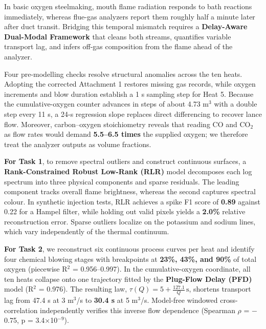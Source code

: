 
In basic oxygen steelmaking, mouth flame radiation responds to bath reactions immediately, whereas flue-gas analyzers report them roughly half a minute later after duct transit. Bridging this temporal mismatch requires a \textbf{Delay-Aware Dual-Modal Framework} that cleans both streams, quantifies variable transport lag, and infers off-gas composition from the flame ahead of the analyzer.

Four pre-modelling checks resolve structural anomalies across the ten heats. Adopting the corrected Attachment 1 restores missing gas records, while oxygen increments and blow duration establish a 1 s sampling step for Heat 5. Because the cumulative-oxygen counter advances in steps of about 4.73 m\ensuremath{^{3}} with a double step every 11 s, a 24-s regression slope replaces direct differencing to recover lance flow. Moreover, carbon–oxygen stoichiometry reveals that reading CO and CO\ensuremath{_{2}} as flow rates would demand \textbf{5.5–6.5 times} the supplied oxygen; we therefore treat the analyzer outputs as volume fractions.

\textbf{For Task 1}, to remove spectral outliers and construct continuous surfaces, a \textbf{Rank-Constrained Robust Low-Rank (RLR)} model decomposes each log spectrum into three physical components and sparse residuals. The leading component tracks overall flame brightness, whereas the second captures spectral colour. In synthetic injection tests, RLR achieves a spike F1 score of \textbf{0.89} against 0.22 for a Hampel filter, while holding out valid pixels yields a \textbf{2.0\%} relative reconstruction error. Sparse outliers localize on the potassium and sodium lines, which vary independently of the thermal continuum.

\textbf{For Task 2}, we reconstruct six continuous process curves per heat and identify four chemical blowing stages with breakpoints at \textbf{23\%, 43\%, and 90\%} of total oxygen (piecewise R\ensuremath{^{2}} = 0.956–0.997). In the cumulative-oxygen coordinate, all ten heats collapse onto one trajectory fitted by the \textbf{Plug-Flow Delay (PFD)} model (R\ensuremath{^{2}} = 0.976). The resulting law, $\tau(Q) = 5 + \frac{127.1}{Q}\,\mathrm{s}$, shortens transport lag from 47.4 s at 3 m\ensuremath{^{3}}/s to \textbf{30.4 s} at 5 m\ensuremath{^{3}}/s. Model-free windowed cross-correlation independently verifies this inverse flow dependence (Spearman \ensuremath{\rho} = \ensuremath{-}0.75, p = 3.4\ensuremath{\times}10\ensuremath{^{-9}}).

